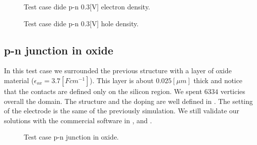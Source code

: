 \vspace{1cm}

\begin{figure}[!h]
\centering
{}
\hspace{1cm}
\caption{Test case dide p-n 0.3[V] electron density.}
\label{fig: ndensity}
\end{figure}

\vspace{1cm}

\begin{figure}[!h]
\centering
{}
\hspace{1cm}
\caption{Test case dide p-n 0.3[V] hole density.}
\label{fig: pdensity}
\end{figure}


\clearpage


\subsection{p-n junction in oxide}
\label{sec: PNOX}

In this test case we surrounded the previous structure with a layer of oxide material ($\epsilon_{ox} = 3.7 [F cm^{-1}]$). This layer is about $0.025[\mu m]$ thick and notice that the contacts are defined only on the silicon region. We spent $6334$ verticies overall the domain. The structure and the doping are well defined in . The setting of the electrode is the same of the previously simulation. We still validate our solutions with the commercial software in ,  and .  

\vspace{0.5cm}

\begin{figure}[!h]
\centering
{}
\hspace{1.5cm}
\caption{Test case p-n junction in oxide.}
\label{fig: structure diodeox}
\end{figure}

